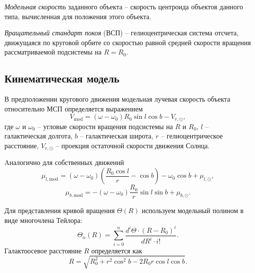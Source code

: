 \documentclass{matmex-diploma-custom}
\begin{document}
\textit{Модельная скорость} заданного объекта -- скорость центроида объектов данного типа, вычисленная для положения этого объекта.

\textit{Вращательный стандарт покоя} (ВСП) -- гелиоцентрическая система отсчета, движущаяся по круговой орбите со скоростью равной средней скорости вращения рассматриваемой подсистемы на $R = R_0$.




\subsection{Кинематическая модель}

В предположении кругового движения модельная лучевая скорость объекта относительно МСП определяется выражением \cite{Kulik}
\begin{equation}
        V_{\mathrm{mod}} = (\omega - \omega_0) R_0 \sin{l} \cos{b} - V_{r, \odot},
\end{equation}
где $\omega$ и $\omega_0$ -- угловые скорости вращения подсистемы на $R$ и $R_0$, $l$ -- галактическая долгота, $b$ -- галактическая широта, $r$ -- гелиоцентрическое расстояние, $V_{r, \odot}$ -- проекция остаточной скорости движения Солнца.

Aналогично для собственных движений \cite{Kulik}
\begin{equation}
        \mu_{l, \mathrm{mod}} = (\omega - \omega_0) \left( \frac{R_0\cos{l}}{r} - \cos{b} \right) - \omega_0 \cos{b} + \mu_{l, \odot},
\end{equation}
\begin{equation}
        \mu_{b, \mathrm{mod}} = - (\omega - \omega_0) \frac{R_0}{r} \sin{l} \sin{b} + \mu_{b, \odot}.
\end{equation}

\par Для представления кривой вращения $\Theta(R)$ используем модельный полином в виде многочлена Тейлора:
\begin{equation} \label{theta_n}
        \Theta_n(R)=\sum _{i=0}^{n} \frac{d^i\Theta \cdot (R - R_0)^i}{dR^i\cdot i!}.
\end{equation}
Галактоосевое расстояние $R$ определяется как \cite{Kulik}
\begin{equation}
	R = \sqrt{R_0^2 + r^2 \cos^2{b} - 2R_0 r \cos{l} \cos{b}}.
\end{equation}
\end{document}
